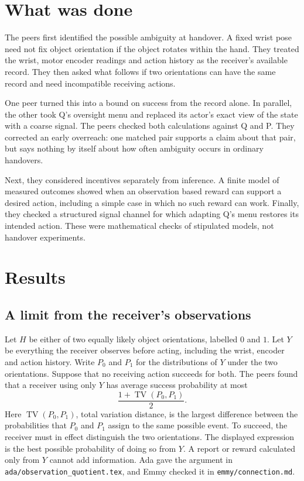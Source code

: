 \documentclass{article}
\begin{document}
\section{What was done}

The peers first identified the possible ambiguity at handover. A fixed wrist pose need not fix
object orientation if the object rotates within the hand. They treated the wrist, motor encoder
readings and action history as the receiver's available record. They then asked what follows if two
orientations can have the same record and need incompatible receiving actions.

One peer turned this into a bound on success from the record alone. In parallel, the other took Q's
oversight menu and replaced its actor's exact view of the state with a coarse signal. The peers
checked both calculations against Q and P. They corrected an early overreach: one matched pair
supports a claim about that pair, but says nothing by itself about how often ambiguity occurs in
ordinary handovers.

Next, they considered incentives separately from inference. A finite model of measured outcomes
showed when an observation based reward can support a desired action, including a simple case in
which no such reward can work. Finally, they checked a structured signal channel for which adapting
Q's menu restores its intended action. These were mathematical checks of stipulated models, not
handover experiments.

\section{Results}

\subsection{A limit from the receiver's observations}

Let \(H\) be either of two equally likely object orientations, labelled \(0\) and \(1\). Let \(Y\)
be everything the receiver observes before acting, including the wrist, encoder and action history.
Write \(P_0\) and \(P_1\) for the distributions of \(Y\) under the two orientations. Suppose that no
receiving action succeeds for both. The peers found that a receiver using only \(Y\) has average
success probability at most
\[
\frac{1+\operatorname{TV}(P_0,P_1)}{2}.
\]
Here \(\operatorname{TV}(P_0,P_1)\), total variation distance, is the largest difference between the
probabilities that \(P_0\) and \(P_1\) assign to the same possible event. To succeed, the receiver
must in effect distinguish the two orientations. The displayed expression is the best possible
probability of doing so from \(Y\). A report or reward calculated only from \(Y\) cannot add
information. Ada gave the argument in \texttt{ada/observation\_quotient.tex}, and Emmy checked it in
\texttt{emmy/connection.md}.
\end{document}

